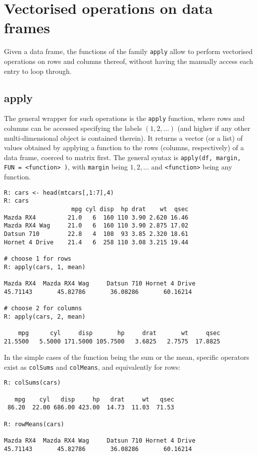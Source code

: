 \chapter{Vectorised operations on data frames}\label{sec: apply}
Given a data frame, the functions of the family
\texttt{apply} allow to perform vectorised operations
on rows and columns thereof, without having the manually
access each entry to loop through.

\section{apply}
The general wrapper for such operations is the
\texttt{apply} function, where rows and columns can 
be accessed specifying the labels $(1,2,\ldots)$ (and higher 
if any other multi-dimensional object is contained 
therein). It returns a vector (or a list) of 
values obtained by applying a function to the 
rows (columns, respectively) of a data frame, coerced
to matrix first. The general syntax is 
\texttt{apply(df, margin, FUN = <function> )}, with \texttt{margin} being
$1,2,\ldots$ and \texttt{<function>} being any function.
\begin{verbatim}
R: cars <- head(mtcars[,1:7],4)
R: cars
                   mpg cyl disp  hp drat    wt  qsec
Mazda RX4         21.0   6  160 110 3.90 2.620 16.46
Mazda RX4 Wag     21.0   6  160 110 3.90 2.875 17.02
Datsun 710        22.8   4  108  93 3.85 2.320 18.61
Hornet 4 Drive    21.4   6  258 110 3.08 3.215 19.44

# choose 1 for rows
R: apply(cars, 1, mean)

Mazda RX4  Mazda RX4 Wag     Datsun 710 Hornet 4 Drive 
45.71143       45.82786       36.08286       60.16214 
      
# choose 2 for columns
R: apply(cars, 2, mean)  

    mpg      cyl     disp       hp     drat       wt     qsec 
21.5500   5.5000 171.5000 105.7500   3.6825   2.7575  17.8825
\end{verbatim}
In the simple cases of the function being the sum or the mean,
specific operators exist as \texttt{colSums} and \texttt{colMeans},
and equivalently for rows:
\begin{verbatim}
R: colSums(cars)

   mpg    cyl   disp     hp   drat     wt   qsec 
 86.20  22.00 686.00 423.00  14.73  11.03  71.53
 
R: rowMeans(cars)

Mazda RX4  Mazda RX4 Wag     Datsun 710 Hornet 4 Drive 
45.71143       45.82786       36.08286       60.16214 
\end{verbatim}

